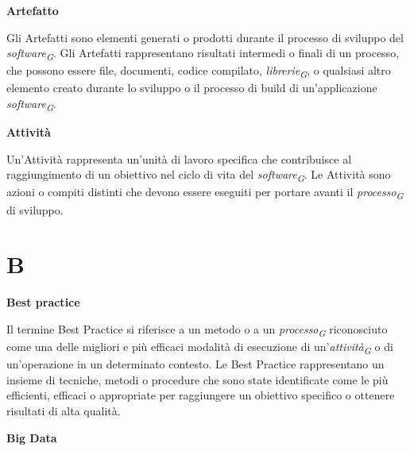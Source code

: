 \documentclass{article}
\begin{document}
\vspace{0.4cm}

\textbf{Artefatto}

\vspace{0.1cm}

Gli Artefatti sono elementi generati o prodotti durante il processo di sviluppo del \textit{software}\textsubscript{\textit{G}}. Gli Artefatti rappresentano risultati intermedi o finali di un processo, che possono essere file, documenti, codice compilato, \textit{librerie}\textsubscript{\textit{G}}, o qualsiasi altro elemento creato durante lo sviluppo o il processo di build di un'applicazione \textit{software}\textsubscript{\textit{G}}.

\vspace{0.4cm}

\textbf{Attività}

\vspace{0.1cm}

Un'Attività rappresenta un'unità di lavoro specifica che contribuisce al raggiungimento di un obiettivo nel ciclo di vita del \textit{software}\textsubscript{\textit{G}}. Le Attività sono azioni o compiti distinti che devono essere eseguiti per portare avanti il \textit{processo}\textsubscript{\textit{G}} di sviluppo.

\pagebreak
\section*{B}

\vspace{0.4cm}
\textbf{Best practice}

\vspace{0.1cm}

Il termine Best Practice si riferisce a un metodo o a un \textit{processo}\textsubscript{\textit{G}} riconosciuto come una delle migliori e più efficaci modalità di esecuzione di un'\textit{attività}\textsubscript{\textit{G}} o di un'operazione in un determinato contesto. Le Best Practice rappresentano un insieme di tecniche, metodi o procedure che sono state identificate come le più efficienti, efficaci o appropriate per raggiungere un obiettivo specifico o ottenere risultati di alta qualità.

\vspace{0.4cm}

\textbf{Big Data}

\vspace{0.1cm}
\end{document}
